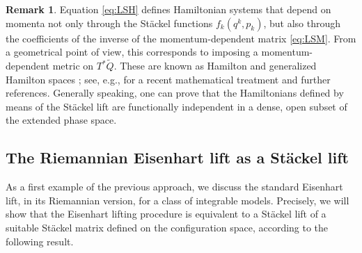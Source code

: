 \documentclass[10pt]{amsart}
\numberwithin{equation}{section}
\theoremstyle{definition}
\newtheorem{remark}{\textbf{Remark}}
\begin{document}
	
	
	
	
	
	\begin{remark}\label{rmk momentum dep}
		Equation \eqref{eq:LSH} defines Hamiltonian systems that depend on momenta not only through the St\"ackel functions $f_k(q^k, p_k)$, but also through the coefficients of the inverse of the momentum-dependent matrix \eqref{eq:LSM}. From a geometrical point of view, this corresponds to imposing a momentum-dependent metric on $T^*\tilde{Q}$. These are known as Hamilton and generalized Hamilton spaces \cite{Miron2001}; see, e.g., \cite{RSS2024} for a recent mathematical treatment and further references. Generally speaking, one can prove that the Hamiltonians defined by means of the St\"ackel lift are functionally independent in a dense, open subset of the extended phase space.
	\end{remark}
	
	\subsection{The Riemannian Eisenhart lift as a St\"ackel lift}
	As a first example of the previous approach, we discuss the standard Eisenhart lift, in its Riemannian version, for a class of integrable models. 
Precisely, we will show that the Eisenhart lifting procedure is equivalent to a St\"ackel lift of a suitable St\"ackel matrix defined on the configuration space, according to the following result.
\end{document}
